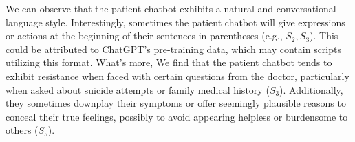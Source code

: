 We can observe that the patient chatbot exhibits a natural and conversational language style.
Interestingly, sometimes the patient chatbot will give expressions or actions at the beginning of their sentences in parentheses (e.g., $S_2,S_3$). This could be attributed to ChatGPT's pre-training data, which may contain scripts utilizing this format. 
What's more, We find that the patient chatbot tends to exhibit resistance when faced with certain questions from the doctor, particularly when asked about suicide attempts or family medical history ($S_3$). Additionally, they sometimes downplay their symptoms or offer seemingly plausible reasons to conceal their true feelings, possibly to avoid appearing helpless or burdensome to others ($S_5$).



